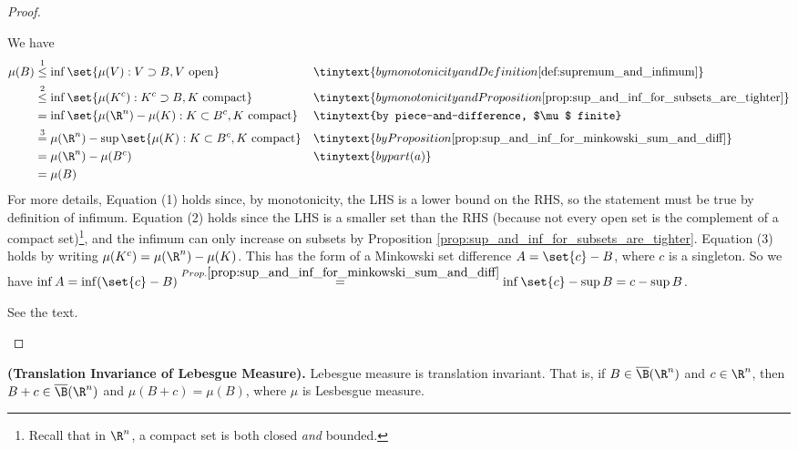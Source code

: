 \documentclass{article} %
\begin{document}
\begin{proof}
\begin{alphabate}
We have 
\begin{align*}
\mu(B) & \stackrel{1}{\leq}	\inf \set{\mu(V) : V \supset B, V \text{ open}} && \tinytext{by monotonicity and Definition \ref{def:supremum_and_infimum}} \\
 & \stackrel{2}{\leq}	\inf \set{\mu(K^c) : K^c \supset B, K \text{ compact}} && \tinytext{by monotonicity and Proposition \ref{prop:sup_and_inf_for_subsets_are_tighter}} \\
 &= \inf \set{\mu(\R^n) - \mu(K) : K \subset B^c, K \text{ compact}} && \tinytext{by piece-and-difference, $\mu$ finite} \\
 & \stackrel{3}{=}	\mu(\R^n) - \sup \set{\mu(K) : K \subset B^c, K \text{ compact}} && \tinytext{by Proposition \ref{prop:sup_and_inf_for_minkowski_sum_and_diff}} \\
  & =	\mu(\R^n) - \mu(B^c)  && \tinytext{by part (a)}\\
&= \mu(B)
\end{align*}
For more details, Equation (1) holds since, by monotonicity, the LHS is a lower bound on the RHS, so the statement must be true by definition of infimum. Equation (2) holds since the LHS is a smaller set than the RHS (because not every open set is the complement of a compact set)\footnote{Recall that in $\R^n$, a compact set is both closed \textit{and} bounded.}, and the infimum can only increase on subsets by Proposition \ref{prop:sup_and_inf_for_subsets_are_tighter}. Equation (3) holds by writing $\mu(K^c) = \mu(\R^n) - \mu(K)$.  This has the form of a Minkowski set difference $A = \set{c} - B$, where $c$ is a singleton.  So we have $\inf A = \inf ( \set{c} - B) \stackrel{Prop. \ref{prop:sup_and_inf_for_minkowski_sum_and_diff}}{=} \inf \set{c} - \sup B = c - \sup B$. 
\item See the text.
\end{alphabate}
 
 \end{proof}


\begin{proposition}
\textbf{(Translation Invariance of Lebesgue Measure).} Lebesgue measure is translation invariant.  That is, if $B \in \overline{\B}(\R^n)$ and $c \in \R^n$, then $B+c \in  \overline{\B}(\R^n)$ and $\mu(B+c)=\mu(B)$, where $\mu$ is Lesbesgue measure.	
\label{prop:lesbesgue_measure_is_translation_invariant}
\end{proposition}
\end{document}
